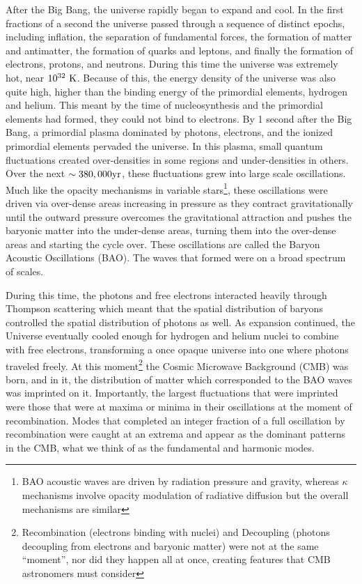\documentclass[11pt,twocolumn]{article}
\begin{document}
After the Big Bang, the universe rapidly began to expand and cool. In the first fractions of a second the universe passed through a sequence of distinct epochs, including inflation, the separation of fundamental forces, the formation of matter and antimatter, the formation of quarks and leptons, and finally the formation of electrons, protons, and neutrons. During this time the universe was extremely hot, near $\rm 10^{32}\ K$. Because of this, the energy density of the universe was also quite high, higher than the binding energy of the primordial elements, hydrogen and helium. This meant by the time of nucleosynthesis and the primordial elements had formed, they could not bind to electrons. By 1 second after the Big Bang, a primordial plasma dominated by photons, electrons, and the ionized primordial elements pervaded the universe. In this plasma, small quantum fluctuations created over-densities in some regions and under-densities in others. Over the next $\sim 380,000\rm yr$, these fluctuations grew into large scale oscillations. Much like the opacity mechanisms in variable stars\footnote{BAO acoustic waves are driven by radiation pressure and gravity, whereas $\kappa$ mechanisms involve opacity modulation of radiative diffusion but the overall mechanisms are similar}, these oscillations were driven via over-dense areas increasing in pressure as they contract gravitationally until the outward pressure overcomes the gravitational attraction and pushes the baryonic matter into the under-dense areas, turning them into the over-dense areas and starting the cycle over. These oscillations are called the Baryon Acoustic Oscillations (BAO). The waves that formed were on a broad spectrum of scales. 

During this time, the photons and free electrons interacted heavily through Thompson scattering which meant that the spatial distribution of baryons controlled the spatial distribution of photons as well. As expansion continued, the Universe eventually cooled enough for hydrogen and helium nuclei to combine with free electrons, transforming a once opaque universe into one where photons traveled freely. At this moment\footnote{Recombination (electrons binding with nuclei) and Decoupling (photons decoupling from electrons and baryonic matter) were not at the same ``moment'', nor did they happen all at once, creating features that CMB astronomers must consider} the Cosmic Microwave Background (CMB) was born, and in it, the distribution of matter which corresponded to the BAO waves was imprinted on it. Importantly, the largest fluctuations that were imprinted were those that were at maxima or minima in their oscillations at the moment of recombination. Modes that completed an integer fraction of a full oscillation by recombination were caught at an extrema and appear as the dominant patterns in the CMB, what we think of as the fundamental and harmonic modes.
\end{document}
